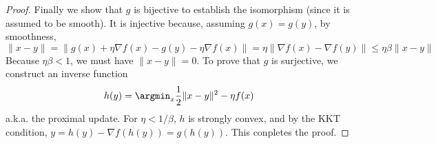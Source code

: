 \begin{example}
\begin{proof}
Finally we show that $g$ is bijective to establish the isomorphism (since it is assumed to be smooth). It is injective because, assuming $g(x) = g(y)$, by smoothness,
$$
\|x-y\| = \|g(x) + \eta\nabla f(x) - g(y) - \eta\nabla f(x) \|
 = \eta\|\nabla f(x) - \nabla f(y)\|\leq \eta\beta\|x-y\|
$$
Because $\eta\beta < 1$, we must have $\|x-y\|=0$.
To prove that $g$ is surjective, we construct an inverse function
$$h(y) = \argmin_x \frac{1}{2}\|x-y\|^2 - \eta f(x)$$
a.k.a. the proximal update. For $\eta < 1/\beta$, $h$ is strongly convex, and by the KKT condition,
$y = h(y) - \nabla f(h(y)) = g(h(y))$. This conpletes the proof.
\end{proof}

\end{example}